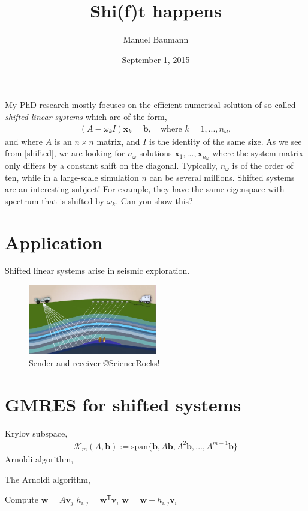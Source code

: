 \documentclass{article}
\title{\bf Shi(f)t happens}
\author{Manuel Baumann}
\date{September 1, 2015}
\begin{document}
 \maketitle
 My PhD research mostly focuses on the efficient numerical solution of so-called \textit{shifted linear systems} which are of the form,
 \begin{align}
 \label{shifted}
  (A - \omega_k I) \mathbf{x}_k = \mathbf{b}, \quad \text{where } k = 1,...,n_\omega,
 \end{align}
 and where $A$ is an $n \times n$ matrix, and $I$ is the identity of the same size. As we see from \eqref{shifted}, we are looking for $n_\omega$ solutions $\mathbf{x}_1,..., \mathbf{x}_{n_\omega}$ where the system matrix only differs by a constant shift on the diagonal. Typically, $n_\omega$ is of the order of ten, while in a large-scale simulation $n$ can be several millions. Shifted systems are an interesting subject! For example, they have the same eigenspace with spectrum that is shifted by $\omega_k$. Can you show this?
 \section{Application}
 Shifted linear systems arise in seismic exploration.
 \begin{figure}[ht]
  \centering
  \includegraphics[width=0.5\textwidth]{figs/Seismic}
  \caption{Sender and receiver \copyright ScienceRocks!} \label{Seimics}
 \end{figure}
 \section{GMRES for shifted systems}
 Krylov subspace,
 \begin{align*}
  \mathcal{K}_m(A,\mathbf{b}) := \text{span} \{\mathbf{b}, A \mathbf{b}, A^2 \mathbf{b},...,A^{m-1}\mathbf{b} \}
 \end{align*}
 Arnoldi algorithm,

\begin{algorithm}[H]
\caption{The Arnoldi algorithm, \cite{GL96}}
\label{alg:Arn}
\begin{algorithmic}
\STATE Compute $\mathbf{w} = A \mathbf{v}_j$
\STATE $h_{i,j} = \mathbf{w}^{\mathsf{T}} \mathbf{v}_i$
\STATE $\mathbf{w} = \mathbf{w} - h_{i,j} \mathbf{v}_i$
\ENDFOR
\ENDFOR
\end{algorithmic}
\end{algorithm}
\end{document}
